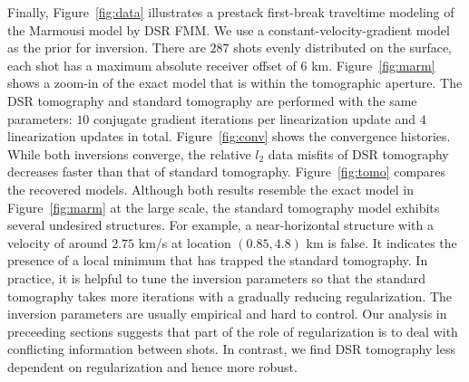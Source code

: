 Finally, Figure~\ref{fig:data} illustrates a prestack first-break traveltime modeling of the Marmousi model by 
DSR FMM. We use a constant-velocity-gradient model as the prior for inversion. There are $287$ 
shots evenly distributed on the surface, each shot has a maximum absolute receiver offset of $6$ 
km. Figure~\ref{fig:marm} shows a zoom-in of the exact model that is within the tomographic aperture. The DSR 
tomography and standard tomography are performed with the same parameters: $10$ conjugate gradient iterations per 
linearization update and $4$ linearization updates in total. Figure~\ref{fig:conv} shows the convergence 
histories. While both inversions converge, the relative $l_2$ data misfits of DSR tomography decreases faster 
than that of standard tomography. Figure~\ref{fig:tomo} compares the recovered models. Although both results 
resemble the exact model in Figure~\ref{fig:marm} at the large scale, the standard tomography model exhibits 
several undesired structures. For example, a near-horizontal structure with a velocity of around $2.75$ km/s at 
location $(0.85,4.8)$ km is false. It indicates the presence of a local minimum that has trapped the standard 
tomography. In practice, it is helpful to tune the inversion parameters so that the standard tomography takes 
more iterations with a gradually reducing regularization. The inversion parameters are usually empirical and hard 
to control. Our analysis in preceeding sections suggests that part of the role of regularization is to deal with 
conflicting information between shots. In contrast, we find DSR tomography less dependent on regularization and 
hence more robust.

